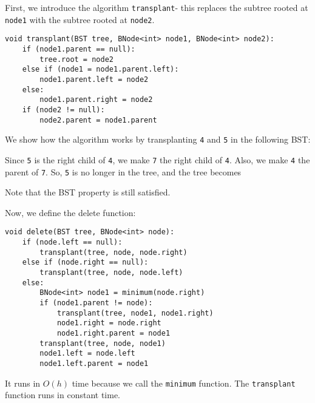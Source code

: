\documentclass[a4paper, openany]{memoir}
\begin{document}
\noindent First, we introduce the algorithm \texttt{transplant}- this replaces the subtree rooted at \texttt{node1} with the subtree rooted at \texttt{node2}.
\begin{lstlisting}[language=pseudocode]
void transplant(BST tree, BNode<int> node1, BNode<int> node2):
    if (node1.parent == null):
        tree.root = node2
    else if (node1 = node1.parent.left):
        node1.parent.left = node2
    else:
        node1.parent.right = node2
    if (node2 != null):
        node2.parent = node1.parent
\end{lstlisting}
We show how the algorithm works by transplanting \texttt{4} and \texttt{5} in the following BST:
\begin{center}
\end{center}
Since \texttt{5} is the right child of \texttt{4}, we make \texttt{7} the right child of \texttt{4}. Also, we make \texttt{4} the parent of \texttt{7}. So, \texttt{5} is no longer in the tree, and the tree becomes
\begin{center}
\end{center}
Note that the BST property is still satisfied.

\noindent Now, we define the delete function:
\begin{lstlisting}[language=pseudocode]
void delete(BST tree, BNode<int> node):
    if (node.left == null):
        transplant(tree, node, node.right)
    else if (node.right == null):
        transplant(tree, node, node.left)
    else:
        BNode<int> node1 = minimum(node.right)
        if (node1.parent != node):
            transplant(tree, node1, node1.right)
            node1.right = node.right
            node1.right.parent = node1
        transplant(tree, node, node1)
        node1.left = node.left
        node1.left.parent = node1
\end{lstlisting}
It runs in $O(h)$ time because we call the \texttt{minimum} function. The \texttt{transplant} function runs in constant time.
\end{document}
